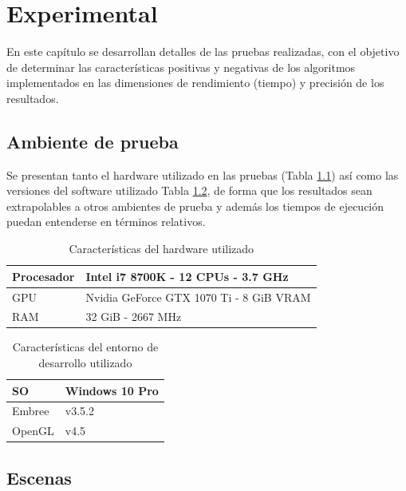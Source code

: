\chapter{Experimental}
\label{ch:chap05}

En este capítulo se desarrollan detalles de las pruebas realizadas, con el objetivo de determinar las características positivas y negativas de los algoritmos implementados en las dimensiones de rendimiento (tiempo) y precisión de los resultados.

\section{Ambiente de prueba}
\label{sec:hardware}

Se presentan tanto el hardware utilizado en las pruebas (Tabla \ref{table:hardware}) así como las versiones del software utilizado Tabla \ref{table:software}, de forma que los resultados sean extrapolables a otros ambientes de prueba y además los tiempos de ejecución puedan entenderse en términos relativos.

\begin{table}[htbp]
	\centering
	\begin{tabular}{l|l}
		Procesador & Intel i7 8700K - 12 CPUs - 3.7 GHz       \\
		\hline
		GPU        & Nvidia GeForce GTX 1070 Ti - 8 GiB  VRAM \\
		\hline
		RAM        & 32 GiB - 2667 MHz                        \\
		\hline
	\end{tabular}
	\caption{Características del hardware utilizado}
	\label{table:hardware}
\end{table}

\begin{table}[htbp]
	\centering
	\begin{tabular}{l|l}
	SO & Windows 10 Pro        \\
		\hline
	Embree        & v3.5.2 \\
		\hline
		OpenGL        & v4.5  \\
		\hline
	\end{tabular}
	\caption{Características del entorno de desarrollo utilizado}
		\label{table:software}
\end{table}

\section{Escenas}
\label{sec:escenas}

